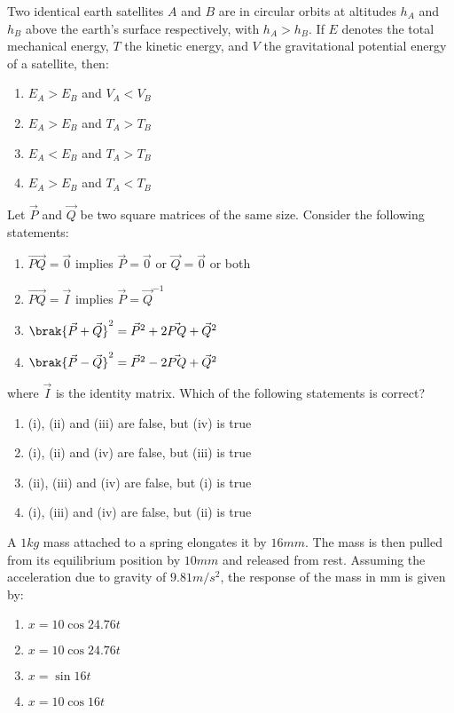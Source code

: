 \item Two identical earth satellites $A$ and $B$ are in circular orbits at altitudes $h_A$
and $h_B$ above the earth's surface respectively, with $h_A > h_B$. If $E$ denotes the total
mechanical energy, $T$ the kinetic energy, and $V$ the gravitational potential energy of a
satellite, then:
\begin{multicols}{2}
    \begin{enumerate}
        \item $E_A > E_B$ and $V_A < V_B$
        \item $E_A > E_B$ and $T_A > T_B$
        \item $E_A < E_B$ and $T_A > T_B$
        \item $E_A > E_B$ and $T_A < T_B$
    \end{enumerate}
\end{multicols}

\item Let $\vec{P}$ and $\vec{Q}$ be two square matrices of the same size. Consider the following statements:
\begin{enumerate}[label=(\roman*)]
    \item $\vec{PQ} = \vec{0}$ implies $\vec{P} = \vec{0}$ or $\vec{Q} = \vec{0}$ or both
    \item $\vec{PQ} = \vec{I}$ implies $\vec{P} = \vec{Q}^{-1}$
    \item $\brak{\vec{P} + \vec{Q}}^2 = \vec{P}^2 + 2\vec{PQ} + \vec{Q}^2$
    \item $\brak{\vec{P} - \vec{Q}}^2 = \vec{P}^2 - 2\vec{PQ} + \vec{Q}^2$
\end{enumerate}
where $\vec{I}$ is the identity matrix. Which of the following statements is correct?
\begin{enumerate}
    \item (i), (ii) and (iii) are false, but (iv) is true
    \item (i), (ii) and (iv) are false, but (iii) is true
    \item (ii), (iii) and (iv) are false, but (i) is true
    \item (i), (iii) and (iv) are false, but (ii) is true
\end{enumerate}

\item A $1 kg$ mass attached to a spring elongates it by $16 mm$. The mass is then pulled from its
equilibrium position by $10 mm$ and released from rest. Assuming the acceleration due to gravity
of $9.81 m/s^2$, the response of the mass in mm is given by:
\begin{multicols}{2}
    \begin{enumerate}
        \item $x = 10 \cos 24.76t$
        \item $x = 10 \cos 24.76t$
        \item $x = \sin 16t$
        \item $x = 10 \cos 16t$
    \end{enumerate}
\end{multicols}

